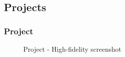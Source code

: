 \documentclass[11pt, letterpaper]{article}
\begin{document}
\subsection{Projects}

\subsubsection*{Project}
\begin{figure}[H]
    \centering
    \setlength{\fboxsep}{0pt}
    \caption{Project - High-fidelity screenshot}
    \label{fig:PageScreenshot_Project}
\end{figure}
\end{document}
